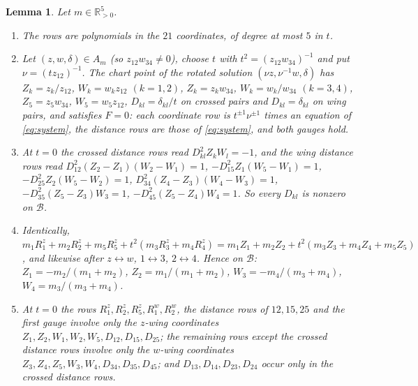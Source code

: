 \documentclass[11pt]{amsart}
\newenvironment{romanlist}{\begin{enumerate}\renewcommand{\labelenumi}{(\roman{enumi})}%
  \renewcommand{\theenumi}{\roman{enumi}}}{\end{enumerate}}
\newtheorem{lemma}[theorem]{Lemma}
\theoremstyle{definition}
\theoremstyle{remark}
\newcommand{\Rp}{\mathbb{R}_{>0}}
\begin{document}
{\begin{lemma}\label{d6-lem-chart}
Let $m\in\Rp^5$.
\begin{romanlist}
  \item The rows are polynomials in the $21$ coordinates, of degree at most $5$ in $t$.
  \item Let $(z,w,\delta)\in A_m$ (so $z_{12}w_{34}\ne0$), choose $t$ with
  $t^2=(z_{12}w_{34})^{-1}$ and put $\nu=(tz_{12})^{-1}$.  The chart point of the rotated
  solution $(\nu z,\nu^{-1}w,\delta)$ has $Z_k=z_k/z_{12}$, $W_k=w_kz_{12}$ $(k=1,2)$,
  $Z_k=z_kw_{34}$, $W_k=w_k/w_{34}$ $(k=3,4)$, $Z_5=z_5w_{34}$, $W_5=w_5z_{12}$,
  $D_{kl}=\delta_{kl}/t$ on crossed pairs and $D_{kl}=\delta_{kl}$ on wing pairs, and satisfies
  $F=0$: each coordinate row is $t^{\pm1}\nu^{\pm1}$ times an equation of \eqref{eq:system}, the
  distance rows are those of \eqref{eq:system}, and both gauges hold.
  \item At $t=0$ the crossed distance rows read $D_{kl}^2Z_kW_l=-1$, and the wing distance rows
  read $D_{12}^2(Z_2-Z_1)(W_2-W_1)=1$, $-D_{15}^2Z_1(W_5-W_1)=1$, $-D_{25}^2Z_2(W_5-W_2)=1$,
  $D_{34}^2(Z_4-Z_3)(W_4-W_3)=1$, $-D_{35}^2(Z_5-Z_3)W_3=1$, $-D_{45}^2(Z_5-Z_4)W_4=1$.  So
  every $D_{kl}$ is nonzero on $\mathcal B$.
  \item Identically,
  $m_1R^z_1+m_2R^z_2+m_5R^z_5+t^2(m_3R^z_3+m_4R^z_4)=m_1Z_1+m_2Z_2+t^2(m_3Z_3+m_4Z_4+m_5Z_5)$,
  and likewise after $z\leftrightarrow w$, $1\leftrightarrow3$, $2\leftrightarrow4$.  Hence on
  $\mathcal B$: $Z_1=-m_2/(m_1+m_2)$, $Z_2=m_1/(m_1+m_2)$, $W_3=-m_4/(m_3+m_4)$,
  $W_4=m_3/(m_3+m_4)$.
  \item At $t=0$ the rows $R^z_1,R^z_2,R^z_5,R^w_1,R^w_2$, the distance rows of $12,15,25$ and
  the first gauge involve only the \emph{$z$-wing coordinates}
  $Z_1,Z_2,W_1,W_2,W_5,D_{12},D_{15},D_{25}$; the remaining rows except the crossed distance rows
  involve only the \emph{$w$-wing coordinates} $Z_3,Z_4,Z_5,W_3,W_4,D_{34},D_{35},D_{45}$; and
  $D_{13},D_{14},D_{23},D_{24}$ occur only in the crossed distance rows.
\end{romanlist}
\end{lemma}}
\end{document}
